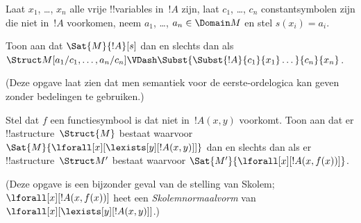 \documentclass[openany]{memoir}
\begin{document}
\begin{prob}
\begin{enumerate}

\end{enumerate}
Laat $x_1$, \dots, $x_n$ alle vrije !!{variable}s in~$!A$ zijn,
laat $c_1$, \dots, $c_n$ constantsymbolen zijn die niet in~$!A$
voorkomen, neem $a_1$, \dots, $a_n \in \Domain M$ en stel
$s(x_i) = a_i$.

Toon aan dat $\Sat{M}{!A}[s]$ dan en slechts dan als
$\Struct M[a_1/c_1,\dots,a_n/c_n]
\VDash \Subst{\Subst{!A}{c_1}{x_1}\dots}{c_n}{x_n}$.

(Deze opgave laat zien dat men semantiek voor de eerste-ordelogica kan
geven zonder bedelingen te gebruiken.)
\end{prob}

\begin{prob}
Stel dat $f$ een functiesymbool is dat niet in~$!A(x,y)$ voorkomt.
Toon aan dat er !!a{structure}~$\Struct{M}$ bestaat waarvoor
$\Sat{M}{\lforall[x][\lexists[y][!A(x,y)]]}$ dan en slechts dan als er
!!a{structure}~$\Struct M'$ bestaat waarvoor
$\Sat{M'}{\lforall[x][!A(x,f(x))]}$.

(Deze opgave is een bijzonder geval van de stelling van Skolem;
$\lforall[x][!A(x,f(x))]$ heet een \emph{Skolemnormaalvorm} van
$\lforall[x][\lexists[y][!A(x,y)]]$.)
\end{prob}
\endgroup

\begingroup
\def\olfilename{OLP-0165}
\def\olfilepath{content/first-order-logic/syntax-and-semantics/}
\hypertarget{unit-OLP-0165}{}




\end{document}
